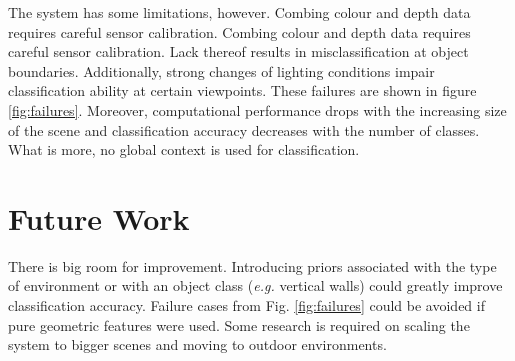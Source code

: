 \documentclass{llncs}
\begin{document}
  The system has some limitations, however. Combing colour and depth data requires careful sensor calibration. Combing colour and depth data requires careful sensor calibration. Lack thereof results in misclassification at object boundaries. Additionally, strong changes of lighting conditions impair classification ability at certain viewpoints. These failures are shown in figure \ref{fig:failures}. Moreover, computational performance drops with the increasing size of the scene and classification accuracy decreases with the number of classes. What is more, no global context is used for classification. 

\section{Future Work}
  
  There is big room for improvement. Introducing priors associated with the type of environment or with an object class (\emph{e.g.} vertical walls) could greatly improve classification accuracy. Failure cases from Fig. \ref{fig:failures} could be avoided if pure geometric features were used. Some research is required on scaling the system to bigger scenes and moving to outdoor environments. 
\end{document}
